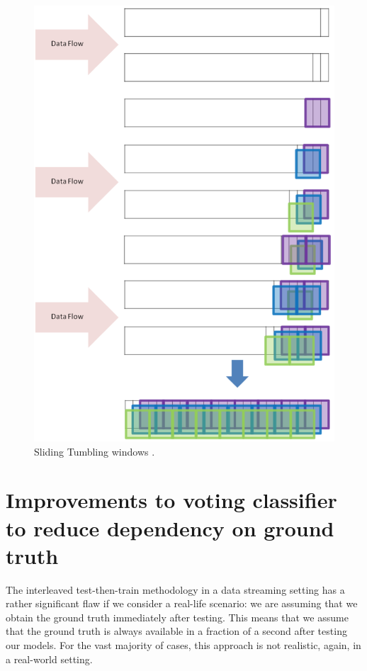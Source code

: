 \begin{figure}
  \includegraphics[width=\linewidth]{./images/chapter3/sliding_tumbling_windows}
  \caption{Sliding Tumbling windows \citep{d2016fine}.}
  \label{fig:sliding_tumbling_windows}
\end{figure}




\section{Improvements to voting classifier to reduce dependency on ground truth\label{section:vc_reduce_gt}}

The interleaved test-then-train methodology in a data streaming setting has a rather significant flaw if we consider a real-life scenario: we are assuming that we obtain the ground truth immediately after testing. This means that we assume that the ground truth is always available in a fraction of a second after testing our models. For the vast majority of cases, this approach is not realistic, again, in a real-world setting.

